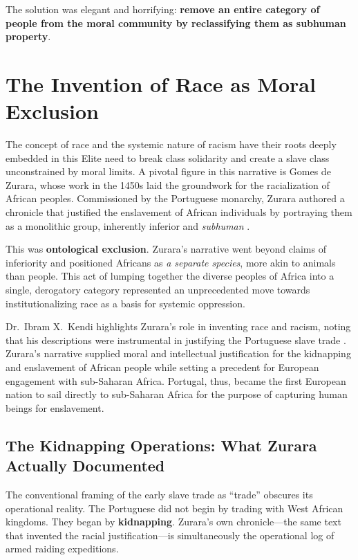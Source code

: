 The solution was elegant and horrifying: \textbf{remove an entire category of people from the moral community by reclassifying them as subhuman property}.
\section{The Invention of Race as Moral Exclusion}

The concept of race and the systemic nature of racism have their roots deeply embedded in this Elite need to break class solidarity and create a slave class unconstrained by moral limits. A pivotal figure in this narrative is Gomes de Zurara, whose work in the 1450s laid the groundwork for the racialization of African peoples. Commissioned by the Portuguese monarchy, Zurara authored a chronicle that justified the enslavement of African individuals by portraying them as a monolithic group, inherently inferior and \textit{subhuman} \cite{zurara, kendi}. 

This was \textbf{ontological exclusion}. Zurara's narrative went beyond claims of inferiority and positioned Africans as \textit{a separate species}, more akin to animals than people. This act of lumping together the diverse peoples of Africa into a single, derogatory category represented an unprecedented move towards institutionalizing race as a basis for systemic oppression.

Dr.\ Ibram X.\ Kendi highlights Zurara's role in inventing race and racism, noting that his descriptions were instrumental in justifying the Portuguese slave trade \cite{kendi}. Zurara's narrative supplied moral and intellectual justification for the kidnapping and enslavement of African people while setting a precedent for European engagement with sub-Saharan Africa. Portugal, thus, became the first European nation to sail directly to sub-Saharan Africa for the purpose of capturing human beings for enslavement.

\subsection{The Kidnapping Operations: What Zurara Actually Documented}

The conventional framing of the early slave trade as ``trade'' obscures its operational reality. The Portuguese did not begin by trading with West African kingdoms. They began by \textbf{kidnapping}. Zurara's own chronicle---the same text that invented the racial justification---is simultaneously the operational log of armed raiding expeditions.

